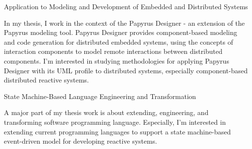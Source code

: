 \begin{cventries}
\cvinterest
{Application to Modeling and Development of Embedded and Distributed Systems}
{\begin{cvitems}
		\item{In my thesis, I work in the context of the Papyrus Designer - an extension of the Papyrus modeling tool.
Papyrus Designer provides component-based modeling and code generation for distributed embedded systems, using the concepts of interaction components to model remote interactions between distributed components.
I'm interested in studying methodologies for applying Papyrus Designer with its UML profile to distributed systems, especially component-based distributed reactive systems.}
\end{cvitems}}

\cvinterest
{State Machine-Based Language Engineering and Transformation}
{\begin{cvitems}
		\item{A major part of my thesis work is about extending, engineering, and transforming software programming language.
Especially, I'm interested in extending current programming languages to support a state machine-based event-driven model for developing reactive systems.}
\end{cvitems}}


\end{cventries}

